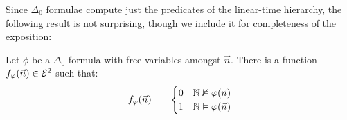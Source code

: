 \documentclass{lmcs}
\begin{document}
%
Since $\Delta_0$ formulae compute just the predicates of the linear-time hierarchy, the following result is not surprising, though we include it for completeness of the exposition:
\begin{lemma}
	\label{lem:char-fns-delzer}
	Let $\phi $ be a $\Delta_0$-formula with free variables amongst $\vec n$.
	There is a function $f_\varphi(\vec n) \in \mathcal{E}^2$ such that:
	\[
	f_\phi(\vec n)
	\ = \ 
	\begin{cases}
	0 & \nat \notmodels \phi (\vec n) \\
	1 & \nat \models \phi (\vec n)
	\end{cases}
	\]
\end{lemma}
\end{document}
